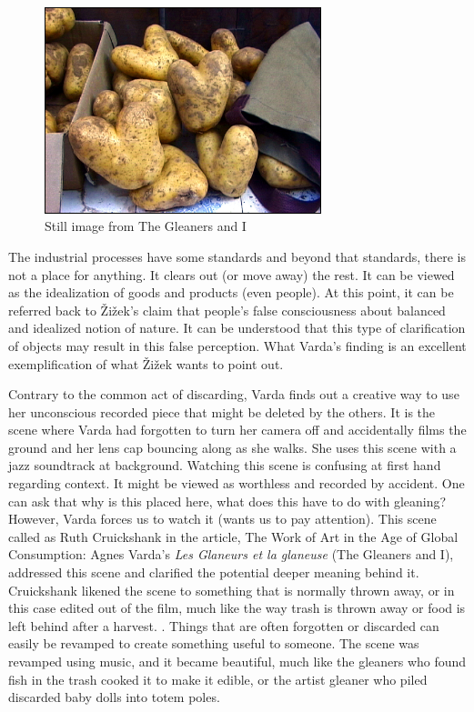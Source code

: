 \begin{figure}[h!]
  \centering
  \includegraphics[height=6cm]{graphics/AgnesVarda_Potatoes.jpg}
  \caption{Still image from The Gleaners and I}
  \label{fig:AgnesVarda_Potatoes}
\end{figure}

The industrial processes have some standards and beyond that standards, there is not a place for anything. It clears out (or move away) the rest. It can be viewed as the idealization of goods and products (even people). At this point, it can be referred back to Žižek's claim that people's false consciousness about balanced and idealized notion of nature. It can be understood that this type of clarification of objects may result in this false perception. What Varda's finding is an excellent exemplification of what Žižek wants to point out.

Contrary to the common act of discarding, Varda finds out a creative way to use her unconscious recorded piece that might be deleted by the others. It is the scene where Varda had forgotten to turn her camera off and accidentally films the ground and her lens cap bouncing along as she walks. She uses this scene with a jazz soundtrack at background. Watching this scene is confusing at first hand regarding context. It might be viewed as worthless and recorded by accident. One can ask that why is this placed here, what does this have to do with gleaning? However, Varda forces us to watch it (wants us to pay attention). This scene called as  Ruth Cruickshank in the article, The Work of Art in the Age of Global Consumption: Agnes Varda’s \textit{Les Glaneurs et la glaneuse} (The Gleaners and I), addressed this scene and clarified the potential deeper meaning behind it. Cruickshank likened the scene to something that is normally thrown away, or in this case edited out of the film, much like the way trash is thrown away or food is left behind after a harvest.  \cite{cruickshank2007work}. Things that are often forgotten or discarded can easily be revamped to create something useful to someone. The scene was revamped using music, and it became beautiful, much like the gleaners who found fish in the trash cooked it to make it edible, or the artist gleaner who piled discarded baby dolls into totem poles.

